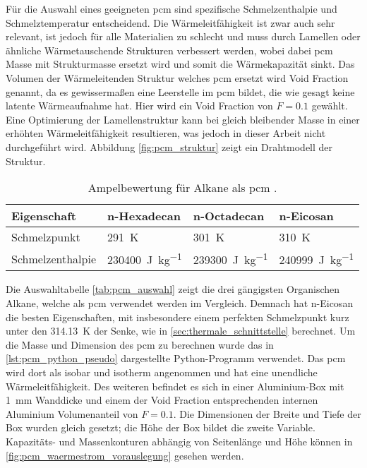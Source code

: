 Für die Auswahl eines geeigneten \ac{pcm} sind spezifische Schmelzenthalpie und Schmelztemperatur entscheidend.
Die Wärmeleitfähigkeit ist zwar auch sehr relevant, ist jedoch für alle Materialien zu schlecht und muss durch Lamellen oder ähnliche Wärmetauschende Strukturen verbessert werden,
wobei dabei \ac{pcm} Masse mit Strukturmasse ersetzt wird und somit die Wärmekapazität sinkt. Das Volumen der Wärmeleitenden Struktur welches
\ac{pcm} ersetzt wird Void Fraction genannt, da es gewissermaßen eine Leerstelle im \ac{pcm} bildet, die wie gesagt keine latente Wärmeaufnahme hat. Hier
wird ein Void Fraction von $F = 0.1$ gewählt. Eine Optimierung der Lamellenstruktur kann bei gleich bleibender Masse in einer erhöhten
Wärmeleitfähigkeit resultieren, was jedoch in dieser Arbeit nicht durchgeführt wird. Abbildung \ref{fig:pcm_struktur} zeigt ein Drahtmodell der Struktur.

\begin{table}[H]
  \centering
  \caption{Ampelbewertung für Alkane als \ac{pcm} \cite{NIST}.}\label{tab:pcm_auswahl}
  \label{tab:pcm_alkane_nist}
  \begin{tabular}{>{\raggedright\arraybackslash}m{3.1cm} m{3.1cm} m{3.1cm} m{3.1cm}}
    \toprule[1pt]
    Eigenschaft & n-Hexadecan & n-Octadecan & n-Eicosan \\
    \midrule[0.5pt]

    Schmelzpunkt
      & \cellcolor{bad}\SI{291}{\kelvin}
      & \cellcolor{medium}\SI{301}{\kelvin}
      & \cellcolor{good}\SI{310}{\kelvin} \\

    Schmelzenthalpie
      & \cellcolor{bad}\SI{230400}{\joule\per\kilo\gram}
      & \cellcolor{medium}\SI{239300}{\joule\per\kilo\gram}
      & \cellcolor{good}\SI{240999}{\joule\per\kilo\gram} \\
    \bottomrule[1pt]
  \end{tabular}
\end{table}

Die Auswahltabelle \ref{tab:pcm_auswahl} zeigt die drei gängigsten Organischen Alkane, welche als \ac{pcm} verwendet werden im Vergleich.
Demnach hat n-Eicosan die besten Eigenschaften, mit insbesondere einem perfekten Schmelzpunkt kurz unter den \SI{314,13}{\kelvin} der Senke,
wie in \ref{sec:thermale_schnittstelle} berechnet.
Um die Masse und Dimension des \ac{pcm} zu berechnen wurde das in \ref{lst:pcm_python_pseudo} dargestellte Python-Programm verwendet.
Das \ac{pcm} wird dort als isobar und isotherm angenommen und hat eine unendliche Wärmeleitfähigkeit. Des weiteren befindet es sich
in einer Aluminium-Box mit \SI{1}{\milli\meter} Wanddicke und einem der Void Fraction entsprechenden internen Aluminium Volumenanteil von $F = 0.1$.
Die Dimensionen der Breite und Tiefe der Box wurden gleich gesetzt; die Höhe der Box bildet die zweite Variable.
Kapazitäts- und Massenkonturen abhängig von Seitenlänge und Höhe können in \ref{fig:pcm_waermestrom_vorauslegung} gesehen werden.

